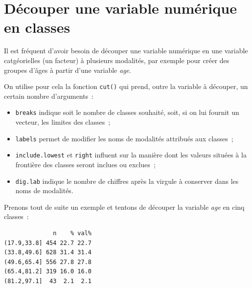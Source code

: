 \documentclass[
  letterpaper,
  DIV=11,
  numbers=noendperiod,
  oneside]{scrreprt}
\newenvironment{Shaded}{\begin{snugshade}}{\end{snugshade}}
\newcommand{\AttributeTok}[1]{\textcolor[rgb]{0.40,0.45,0.13}{#1}}
\newcommand{\DecValTok}[1]{\textcolor[rgb]{0.68,0.00,0.00}{#1}}
\newcommand{\FunctionTok}[1]{\textcolor[rgb]{0.28,0.35,0.67}{#1}}
\newcommand{\NormalTok}[1]{\textcolor[rgb]{0.00,0.23,0.31}{#1}}
\newcommand{\OtherTok}[1]{\textcolor[rgb]{0.00,0.23,0.31}{#1}}
\newcommand{\SpecialCharTok}[1]{\textcolor[rgb]{0.37,0.37,0.37}{#1}}
\providecommand{\tightlist}{%
  \setlength{\itemsep}{0pt}\setlength{\parskip}{0pt}}\usepackage{longtable,booktabs,array}
\begin{document}
\hypertarget{sec-cut}{%
\section{Découper une variable numérique en classes}\label{sec-cut}}

Il est fréquent d'avoir besoin de découper une variable numérique en une
variable catgéorielles (un facteur) à plusieurs modalités, par exemple
pour créer des groupes d'âges à partir d'une variable \emph{age}.

On utilise pour cela la fonction \texttt{cut()} qui prend, outre la
variable à découper, un certain nombre d'arguments~:

\begin{itemize}
\tightlist
\item
  \texttt{breaks} indique soit le nombre de classes souhaité, soit, si
  on lui fournit un vecteur, les limites des classes~;
\item
  \texttt{labels} permet de modifier les noms de modalités attribués aux
  classes~;
\item
  \texttt{include.lowest} et \texttt{right} influent sur la manière dont
  les valeurs situées à la frontière des classes seront inclues ou
  exclues~;
\item
  \texttt{dig.lab} indique le nombre de chiffres après la virgule à
  conserver dans les noms de modalités.
\end{itemize}

Prenons tout de suite un exemple et tentons de découper la variable
\emph{age} en cinq classes~:

\begin{Shaded}
\end{Shaded}

\begin{verbatim}
              n    % val%
(17.9,33.8] 454 22.7 22.7
(33.8,49.6] 628 31.4 31.4
(49.6,65.4] 556 27.8 27.8
(65.4,81.2] 319 16.0 16.0
(81.2,97.1]  43  2.1  2.1
\end{verbatim}
\end{document}
